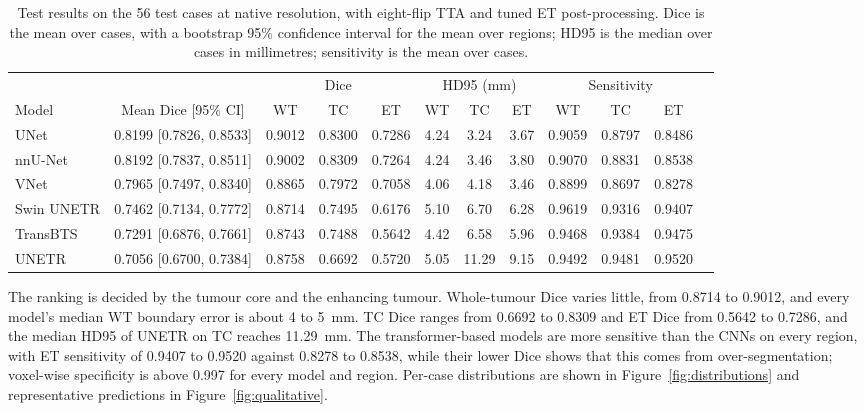 \documentclass[final,3p,times,number]{elsarticle}
\begin{document}
\begin{table}[htbp]
\centering
\caption{Test results on the 56 test cases at native resolution, with eight-flip TTA and tuned ET post-processing. Dice is the mean over cases, with a bootstrap 95\% confidence interval for the mean over regions; HD95 is the median over cases in millimetres; sensitivity is the mean over cases.}
\label{tab:seg-performance}
\scriptsize
\begin{tabular*}{\textwidth}{@{\extracolsep{\fill}}lccccccccccc@{}}
\toprule
 & & \multicolumn{3}{c}{Dice} & \multicolumn{3}{c}{HD95 (mm)} & \multicolumn{3}{c}{Sensitivity} \\
\cmidrule(lr){3-5}\cmidrule(lr){6-8}\cmidrule(l){9-11}
Model & Mean Dice [95\% CI] & WT & TC & ET & WT & TC & ET & WT & TC & ET \\
\midrule
UNet & 0.8199 [0.7826, 0.8533] & 0.9012 & 0.8300 & 0.7286 & 4.24 & 3.24 & 3.67 & 0.9059 & 0.8797 & 0.8486 \\
nnU-Net & 0.8192 [0.7837, 0.8511] & 0.9002 & 0.8309 & 0.7264 & 4.24 & 3.46 & 3.80 & 0.9070 & 0.8831 & 0.8538 \\
VNet & 0.7965 [0.7497, 0.8340] & 0.8865 & 0.7972 & 0.7058 & 4.06 & 4.18 & 3.46 & 0.8899 & 0.8697 & 0.8278 \\
Swin UNETR & 0.7462 [0.7134, 0.7772] & 0.8714 & 0.7495 & 0.6176 & 5.10 & 6.70 & 6.28 & 0.9619 & 0.9316 & 0.9407 \\
TransBTS & 0.7291 [0.6876, 0.7661] & 0.8743 & 0.7488 & 0.5642 & 4.42 & 6.58 & 5.96 & 0.9468 & 0.9384 & 0.9475 \\
UNETR & 0.7056 [0.6700, 0.7384] & 0.8758 & 0.6692 & 0.5720 & 5.05 & 11.29 & 9.15 & 0.9492 & 0.9481 & 0.9520 \\
\bottomrule
\end{tabular*}
\end{table}

The ranking is decided by the tumour core and the enhancing tumour. Whole-tumour Dice varies little, from 0.8714 to 0.9012, and every model's median WT boundary error is about 4 to 5~mm. TC Dice ranges from 0.6692 to 0.8309 and ET Dice from 0.5642 to 0.7286, and the median HD95 of UNETR on TC reaches 11.29~mm. The transformer-based models are more sensitive than the CNNs on every region, with ET sensitivity of 0.9407 to 0.9520 against 0.8278 to 0.8538, while their lower Dice shows that this comes from over-segmentation; voxel-wise specificity is above 0.997 for every model and region. Per-case distributions are shown in Figure~\ref{fig:distributions} and representative predictions in Figure~\ref{fig:qualitative}.
\end{document}
